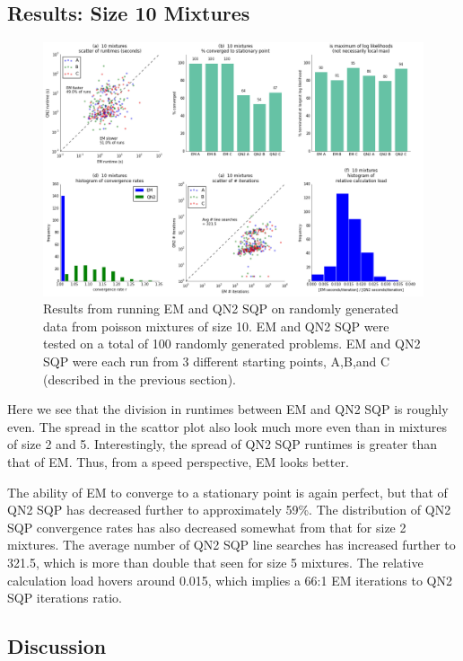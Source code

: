 \documentclass[letter,12pt]{article}
\begin{document}
\pagebreak
\subsection{Results:  Size 10 Mixtures}
\begin{figure}[h]
\centering
\includegraphics[width=16cm]{fig_RunData2_K10_init3.png}
\caption{Results from running EM and QN2 SQP on randomly generated data from poisson mixtures of size 10.  EM and QN2 SQP were tested on a total of 100 randomly generated problems.  EM and QN2 SQP were each run from 3 different starting points, A,B,and C (described in the previous section).}
\end{figure}

Here we see that the division in runtimes between EM and QN2 SQP is roughly even.  The spread in the scattor plot also look much more even than in mixtures of size 2 and 5.  Interestingly, the spread of QN2 SQP runtimes is greater than that of EM.  Thus, from a speed perspective, EM looks better.

The ability of EM to converge to a stationary point is again perfect, but that of QN2 SQP has decreased further to approximately 59\%.  The distribution of QN2 SQP convergence rates has also decreased somewhat from that for size 2 mixtures.  The average number of QN2 SQP line searches has increased further to 321.5, which is more than double that seen for size 5 mixtures.  The relative calculation load hovers around 0.015, which implies a 66:1 EM iterations to QN2 SQP iterations ratio.

\subsection{Discussion}
\end{document}
